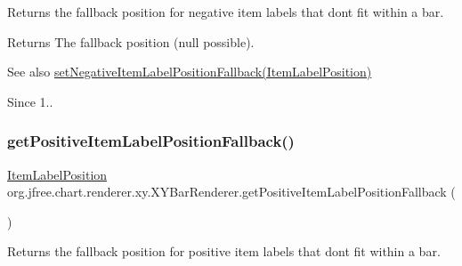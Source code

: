 Returns the fallback position for negative item labels that don\textquotesingle{}t fit within a bar.

\begin{DoxyReturn}{Returns}
The fallback position ({\ttfamily null} possible).
\end{DoxyReturn}
\begin{DoxySeeAlso}{See also}
\mbox{\hyperlink{classorg_1_1jfree_1_1chart_1_1renderer_1_1xy_1_1_x_y_bar_renderer_ae75032392dda175fb9440309d6d84c9a}{set\+Negative\+Item\+Label\+Position\+Fallback(\+Item\+Label\+Position)}} 
\end{DoxySeeAlso}
\begin{DoxySince}{Since}
1.. 
\end{DoxySince}
\mbox{\label{classorg_1_1jfree_1_1chart_1_1renderer_1_1xy_1_1_x_y_bar_renderer_aef50803eeebe109e0a137245d5099f76}} 
\subsubsection{\texorpdfstring{get\+Positive\+Item\+Label\+Position\+Fallback()}{getPositiveItemLabelPositionFallback()}}
{\footnotesize\ttfamily \mbox{\hyperlink{classorg_1_1jfree_1_1chart_1_1labels_1_1_item_label_position}{Item\+Label\+Position}} org.\+jfree.\+chart.\+renderer.\+xy.\+X\+Y\+Bar\+Renderer.\+get\+Positive\+Item\+Label\+Position\+Fallback (\begin{DoxyParamCaption}{ }\end{DoxyParamCaption})}

Returns the fallback position for positive item labels that don\textquotesingle{}t fit within a bar.

